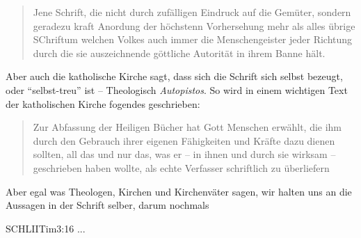 \begin{quote}
    Jene Schrift, die nicht durch zufälligen Eindruck auf die Gemüter, sondern geradezu kraft Anordung der höchstenn Vorhersehung mehr als alles übrige SChriftum welchen Volkes auch immer die Menschengeister jeder Richtung durch die sie auszeichnende göttliche Autorität in ihrem Banne hält.
\end{quote}

Aber auch die katholische Kirche sagt, dass sich die Schrift sich selbst bezeugt, oder \enquote{selbst-treu} ist -- Theologisch \textit{Autopistos}.
So wird in einem wichtigen Text der katholischen Kirche fogendes geschrieben:
\begin{quote}
    Zur Abfassung der Heiligen Bücher hat Gott Menschen erwählt, die ihm durch den Gebrauch ihrer eigenen Fähigkeiten und Kräfte dazu dienen sollten, all das und nur das, was er -- in ihnen und durch sie wirksam -- geschrieben haben wollte, als echte Verfasser schriftlich zu überliefern
\end{quote}

Aber egal was Theologen, Kirchen und Kirchenväter sagen, wir halten uns an die Aussagen in der Schrift selber, darum nochmals 
\begin{bibelbox}{SCHL}{IITim}{3:16}
...
\end{bibelbox}